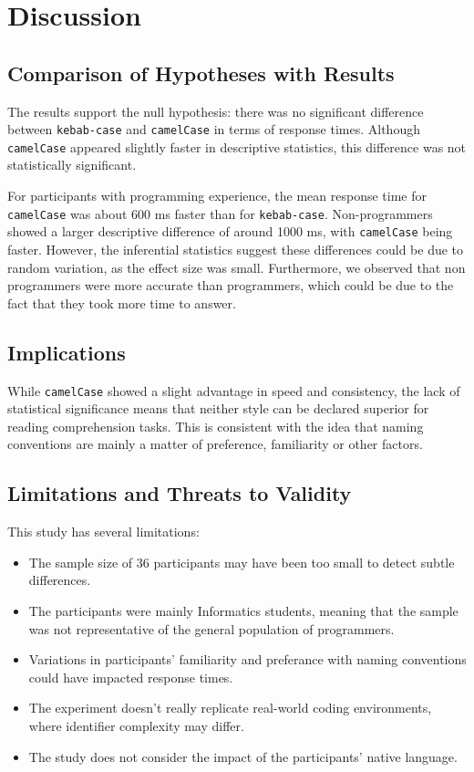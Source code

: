 \documentclass[unicode,11pt,a4paper,oneside,numbers=endperiod,openany]{scrartcl}
\begin{document}
\section{Discussion}
\subsection{Comparison of Hypotheses with Results}
The results support the null hypothesis: there was no significant difference between \texttt{kebab-case} and \texttt{camelCase} in terms of response times. Although \texttt{camelCase} appeared slightly faster in descriptive statistics, this difference was not statistically significant.

For participants with programming experience, the mean response time for \texttt{camelCase} was about 600 ms faster than for \texttt{kebab-case}. Non-programmers showed a larger descriptive difference of around 1000 ms, with \texttt{camelCase} being faster. However, the inferential statistics suggest these differences could be due to random variation, as the effect size was small. Furthermore, we observed that non programmers were more accurate than programmers, which could be due to the fact that they took more time to answer.
\subsection{Implications}
While \texttt{camelCase} showed a slight advantage in speed and consistency, the lack of statistical significance means that neither style can be declared superior for reading comprehension tasks. This is consistent with the idea that naming conventions are mainly a matter of preference, familiarity or other factors.

\subsection{Limitations and Threats to Validity}
This study has several limitations:
\begin{itemize}
    \item The sample size of 36 participants may have been too small to detect subtle differences.
    \item The participants were mainly Informatics students, meaning that the sample was not representative of the general population of programmers.
    \item Variations in participants' familiarity and preferance with naming conventions could have impacted response times.
    \item The experiment doesn't really replicate real-world coding environments, where identifier complexity may differ.
    \item The study does not consider the impact of the participants' native language.
\end{itemize}
\end{document}
